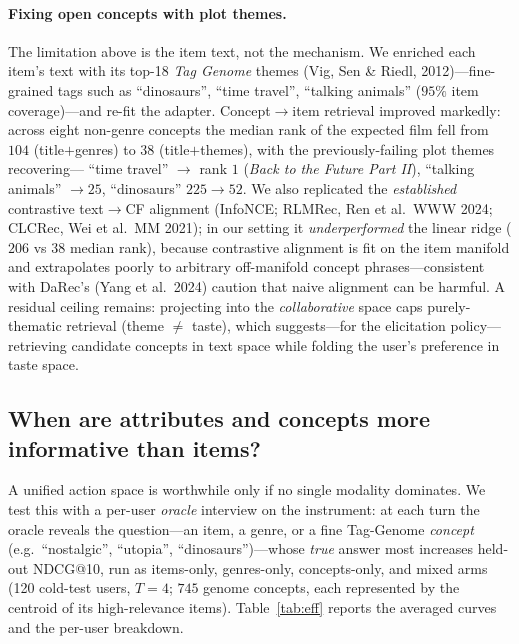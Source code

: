 \paragraph{Fixing open concepts with plot themes.} The limitation above is the item text, not the mechanism. We
enriched each item's text with its top-18 \emph{Tag Genome} themes (Vig, Sen \& Riedl, 2012)---fine-grained tags
such as ``dinosaurs'', ``time travel'', ``talking animals'' ($95\%$ item coverage)---and re-fit the adapter.
Concept$\to$item retrieval improved markedly: across eight non-genre concepts the median rank of the expected film
fell from $104$ (title$+$genres) to $38$ (title$+$themes), with the previously-failing plot themes recovering---
``time travel'' $\to$ rank $1$ (\emph{Back to the Future Part II}), ``talking animals'' $\to 25$, ``dinosaurs''
$225\to52$. We also replicated the \emph{established} contrastive text$\to$CF alignment (InfoNCE; RLMRec, Ren et
al.\ WWW 2024; CLCRec, Wei et al.\ MM 2021); in our setting it \emph{underperformed} the linear ridge ($206$ vs
$38$ median rank), because contrastive alignment is fit on the item manifold and extrapolates poorly to arbitrary
off-manifold concept phrases---consistent with DaRec's (Yang et al.\ 2024) caution that naive alignment can be
harmful. A residual ceiling remains: projecting into the \emph{collaborative} space caps purely-thematic retrieval
(theme $\neq$ taste), which suggests---for the elicitation policy---retrieving candidate concepts in text space
while folding the user's preference in taste space.

\subsection{When are attributes and concepts more informative than items?}\label{sec:efficiency}
A unified action space is worthwhile only if no single modality dominates. We test this with a per-user
\emph{oracle} interview on the instrument: at each turn the oracle reveals the question---an item, a genre, or a
fine Tag-Genome \emph{concept} (e.g.\ ``nostalgic'', ``utopia'', ``dinosaurs'')---whose \emph{true} answer most
increases held-out NDCG@10, run as items-only, genres-only, concepts-only, and mixed arms (120 cold-test users,
$T{=}4$; $745$ genome concepts, each represented by the centroid of its high-relevance items).
Table~\ref{tab:eff} reports the averaged curves and the per-user breakdown.

